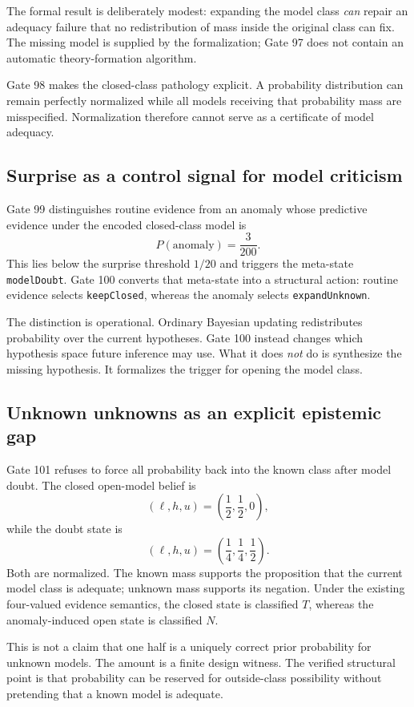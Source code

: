 The formal result is deliberately modest: expanding the model class \emph{can} repair an adequacy failure that no redistribution of mass inside the original class can fix. The missing model is supplied by the formalization; Gate 97 does not contain an automatic theory-formation algorithm.

Gate 98 makes the closed-class pathology explicit. A probability distribution can remain perfectly normalized while all models receiving that probability mass are misspecified. Normalization therefore cannot serve as a certificate of model adequacy.

\subsection{Surprise as a control signal for model criticism}

Gate 99 distinguishes routine evidence from an anomaly whose predictive evidence under the encoded closed-class model is
\[
P(\mathrm{anomaly})=\frac3{200}.
\]
This lies below the surprise threshold $1/20$ and triggers the meta-state \texttt{modelDoubt}. Gate 100 converts that meta-state into a structural action: routine evidence selects \texttt{keepClosed}, whereas the anomaly selects \texttt{expandUnknown}.

The distinction is operational. Ordinary Bayesian updating redistributes probability over the current hypotheses. Gate 100 instead changes which hypothesis space future inference may use. What it does \emph{not} do is synthesize the missing hypothesis. It formalizes the trigger for opening the model class.

\subsection{Unknown unknowns as an explicit epistemic gap}

Gate 101 refuses to force all probability back into the known class after model doubt. The closed open-model belief is
\[
(\ell,h,u)=\left(\frac12,\frac12,0\right),
\]
while the doubt state is
\[
(\ell,h,u)=\left(\frac14,\frac14,\frac12\right).
\]
Both are normalized. The known mass supports the proposition that the current model class is adequate; unknown mass supports its negation. Under the existing four-valued evidence semantics, the closed state is classified $T$, whereas the anomaly-induced open state is classified $N$.

This is not a claim that one half is a uniquely correct prior probability for unknown models. The amount is a finite design witness. The verified structural point is that probability can be reserved for outside-class possibility without pretending that a known model is adequate.

